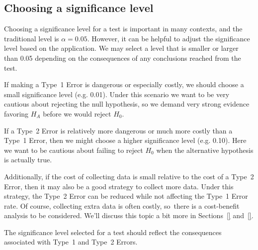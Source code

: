 \subsection{Choosing a significance level}
\label{significanceLevel}


Choosing a significance level for a test is important in
many contexts, and the traditional level is $\alpha = 0.05$.
However, it can be helpful to adjust the significance level
based on the application. We may select a level that is
smaller or larger than 0.05 depending on the consequences
of any conclusions reached from the test.

If making a Type~1 Error is dangerous or especially costly,
we should choose a small significance level (e.g. 0.01).
Under this scenario we want to be very cautious about
rejecting the null hypothesis, so we demand very strong
evidence favoring $H_A$ before we would reject $H_0$.

If a Type~2 Error is relatively more dangerous or much more
costly than a Type~1 Error, then we might choose a higher
significance level (e.g. 0.10). Here we want to be cautious
about failing to reject $H_0$ when the alternative hypothesis
is actually true.

Additionally, if the cost of collecting data is small relative
to the cost of a Type~2 Error, then it may also be a good
strategy to collect more data.
Under this strategy, the Type~2 Error can be reduced
while not affecting the Type~1 Error rate.
Of course, collecting extra data is often costly,
so~there is a cost-benefit analysis to be considered.
We'll discuss this topic a bit more in
Sections~\ref{} and~\ref{}.

\begin{tipBox}{
  The significance level selected for a test should reflect
  the consequences associated with Type~1 and Type~2 Errors.}
\end{tipBox}

\newcommand{\doorhingeflawrate}{0.2}

